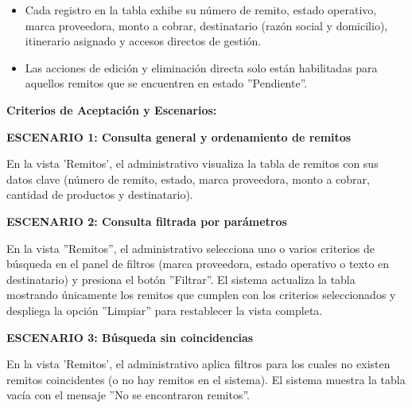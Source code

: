 \documentclass[a4paper,9pt]{article}
\begin{document}
\begin{tcolorbox}[hucard, title={\textbf{HU-5: CONSULTAR REMITOS REGISTRADOS} \hfill \scriptsize \colorbox{tealstatus}{\textbf{\ Accepted\ }} \quad \colorbox{white}{\textcolor{primarydark}{\textbf{\ 2 pts\ }}}}]
{\begin{itemize}[leftmargin=12pt, nosep, itemsep=1.5pt, topsep=1pt]
\item Cada registro en la tabla exhibe su número de remito, estado operativo, marca proveedora, monto a cobrar, destinatario (razón social y domicilio), itinerario asignado y accesos directos de gestión.
\item Las acciones de edición y eliminación directa solo están habilitadas para aquellos remitos que se encuentren en estado ''Pendiente''.
\end{itemize}
}\par\vspace{3pt}
\noindent\textbf{\footnotesize Criterios de Aceptación y Escenarios:}\par\vspace{2pt}
{\footnotesize
\noindent\textbf{\textcolor{secondarydark}{ESCENARIO 1:  Consulta general y ordenamiento de remitos}}\par\vspace{1pt}
En la vista 'Remitos', el administrativo visualiza la tabla de remitos con sus datos clave (número de remito, estado, marca proveedora, monto a cobrar, cantidad de productos y destinatario).\par\vspace{2.5pt}
\noindent\textbf{\textcolor{secondarydark}{ESCENARIO 2:  Consulta filtrada por parámetros}}\par\vspace{1pt}
En la vista ''Remitos'', el administrativo selecciona uno o varios criterios de búsqueda en el panel de filtros (marca proveedora, estado operativo o texto en destinatario) y presiona el botón ''Filtrar''. El sistema actualiza la tabla mostrando únicamente los remitos que cumplen con los criterios seleccionados y despliega la opción ''Limpiar'' para restablecer la vista completa.\par\vspace{2.5pt}
\noindent\textbf{\textcolor{secondarydark}{ESCENARIO 3:  Búsqueda sin coincidencias}}\par\vspace{1pt}
En la vista 'Remitos', el administrativo aplica filtros para los cuales no existen remitos coincidentes (o no hay remitos en el sistema). El sistema muestra la tabla vacía con el mensaje ''No se encontraron remitos''.\par\vspace{2.5pt}
}\par
\end{tcolorbox}
\end{document}
